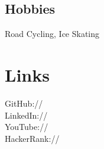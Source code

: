 \documentclass[]{deedy-resume-openfont}
\begin{document}
\begin{minipage}[t]{0.33\textwidth}
\vspace{2mm}

\subsection{Hobbies}
Road Cycling, Ice Skating\\



\section{Links} 
GitHub:// \href{https://github.com/MathBunny}{} \\
LinkedIn://  \href{https://www.linkedin.com/in/horatiulazu}{} \\
YouTube://  \href{https://www.youtube.com/user/SoftwareEngenius}{} \\
HackerRank://  \href{https://www.hackerrank.com/MathBunny123#!}{} \\
\sectionsep

%
%

\end{minipage} 
\hfill
\end{document}
